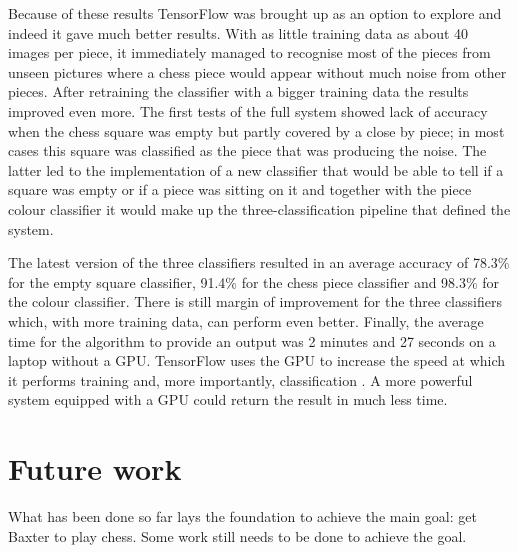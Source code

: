 \documentclass{l4proj}
\begin{document}
Because of these results TensorFlow was brought up as an option to explore and indeed it gave much better results. With as little training data as about 40 images per piece, it immediately managed to recognise most of the pieces from unseen pictures where a chess piece would appear without much noise from other pieces. After retraining the classifier with a bigger training data the results improved even more. The first tests of the full system showed lack of accuracy when the chess square was empty but partly covered by a close by piece; in most cases this square was classified as the piece that was producing the noise. The latter led to the implementation of a new classifier that would be able to tell if a square was empty or if a piece was sitting on it and together with the piece colour classifier it would make up the three-classification pipeline that defined the system. 

The latest version of the three classifiers resulted in an average accuracy of 78.3\% for the empty square classifier, 91.4\% for the chess piece classifier and 98.3\% for the colour classifier. There is still margin of improvement for the three classifiers which, with more training data, can perform even better. Finally, the average time for the algorithm to provide an output was 2 minutes and 27 seconds on a laptop without a GPU. TensorFlow uses the GPU to increase the speed at which it performs training and, more importantly, classification \cite{TensorFlowGPU}. A more powerful system equipped with a GPU could return the result in much less time.



\section{Future work}

What has been done so far lays the foundation to achieve the main goal: get Baxter to play chess. Some work still needs to be done to achieve the goal. 
\end{document}

